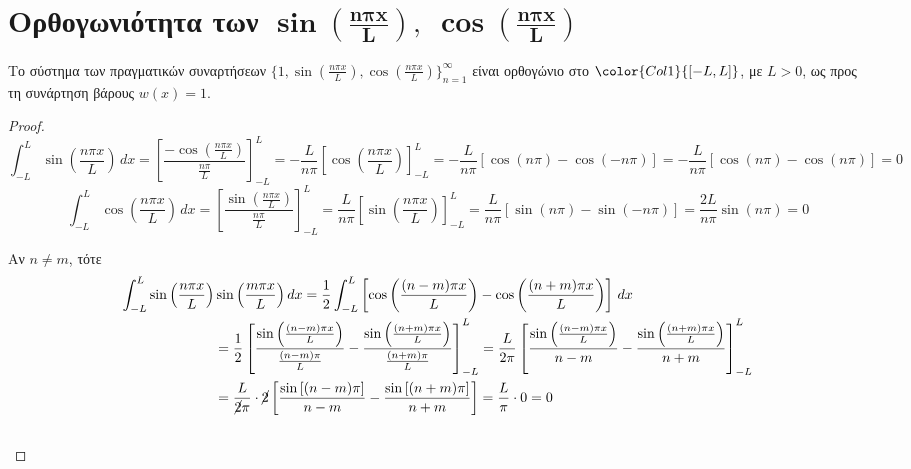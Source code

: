\section*{Ορθογωνιότητα των \ensuremath{\boldsymbol{\sin{(\frac{n \pi x}{L})}, \; 
\cos{(\frac{n \pi x}{L})}}}}

\begin{prop}
  Το σύστημα των πραγματικών συναρτήσεων 
  $ \{ 1, \sin{(\frac{n \pi x}{L})}, \cos{(\frac{n \pi x}{L})} \}_{n=1}^{\infty} $ 
  είναι ορθογώνιο στο $ \color{Col1}{[-L,L]} $, με $ L>0 $, ως προς τη συνάρτηση 
  βάρους $ w(x)=1 $.
\end{prop}
\begin{proof}
  \[
    \int _{-L}^{L} \sin{\left(\frac{n \pi x}{L}\right)} \,{dx} =  
    \left[\frac{- \cos{\left(\frac{n \pi x}{L}\right)}}{\frac{n \pi }{L}} 
    \right]_{-L}^{L} 
    = - \frac{L}{n \pi} \left[\cos{\left(\frac{n \pi x}{L}\right)} \right]_{-L}^{L} = 
    - \frac{L}{n \pi} [ \cos{(n \pi)} - \cos{(- n \pi)}] = - \frac{L}{n \pi } 
    [ \cos{(n \pi)}- \cos{(n \pi)}] = 0 
  \] 
  \[
    \int _{-L}^{L} \cos{\left(\frac{n \pi x}{L}\right)} \,{dx} =  
    \left[\frac{\sin{\left(\frac{n \pi x}{L}\right)}}{\frac{n \pi }{L}} \right]_{-L}^{L} 
    = \frac{L}{n \pi} \left[\sin{\left(\frac{n \pi x}{L}\right)} \right]_{-L}^{L} = 
    \frac{L}{n \pi} [ \sin{(n \pi)} - \sin{(- n \pi)}] =  \frac{2L}{n \pi } 
    \sin{(n \pi)} = 0 
  \]
  \begin{myitemize}
    \item Αν $ n \neq m $, τότε
      \begin{align*}
        \int _{-L}^{L} \sin{\left(\frac{n \pi x }{L}\right)} 
        &\sin{\left(\frac{m \pi x}{L}\right)} \,{dx} 
        = \frac{1}{2} \int _{-L}^{L} \left[\cos{\left(\frac{(n-m) \pi x}{L}\right)} 
        - \cos{\left(\frac{(n+m) \pi x}{L}\right)} \right] \,{dx} \\
        &= \frac{1}{2} \left[\frac{\sin{\left(\frac{(n-m) \pi x}{L}\right)}}
          {\frac{(n-m) \pi}{L}} - \frac{\sin{\left(\frac{(n+m) \pi x}{L}\right)}}
        {\frac{(n+m) \pi }{L}}\right]_{-L}^{L} 
        = \frac{L}{2 \pi} \left[\frac{\sin{\left(\frac{(n-m) \pi
          x}{L}\right)}}{n-m} - 
        \frac{\sin{\left(\frac{(n+m) \pi x}{L}\right)}}{n+m}\right]_{-L}^{L} \\ 
        &= \frac{L}{\cancel{2}\pi} \cdot \cancel{2}
        \left[ \frac{\sin{[(n-m) \pi]}}{n-m} - \frac{\sin{[(n+m)
        \pi]}}{n+m}\right] = \frac{L}{\pi} \cdot 0 = 0
      \end{align*} 
      \begin{align*}

\end{align*}
\end{myitemize}
\end{proof}
